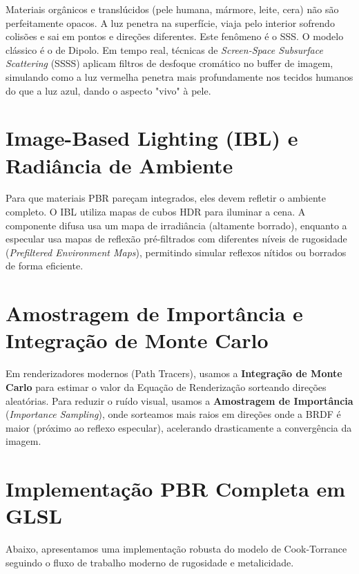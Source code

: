 Materiais orgânicos e translúcidos (pele humana, mármore, leite, cera) não são perfeitamente opacos. A luz penetra na superfície, viaja pelo interior sofrendo colisões e sai em pontos e direções diferentes. Este fenômeno é o SSS. O modelo clássico é o de Dipolo. Em tempo real, técnicas de \textit{Screen-Space Subsurface Scattering} (SSSS) aplicam filtros de desfoque cromático no buffer de imagem, simulando como a luz vermelha penetra mais profundamente nos tecidos humanos do que a luz azul, dando o aspecto "vivo" à pele.

\section{Image-Based Lighting (IBL) e Radiância de Ambiente}

Para que materiais PBR pareçam integrados, eles devem refletir o ambiente completo. O IBL utiliza mapas de cubos HDR para iluminar a cena. A componente difusa usa um mapa de irradiância (altamente borrado), enquanto a especular usa mapas de reflexão pré-filtrados com diferentes níveis de rugosidade (\textit{Prefiltered Environment Maps}), permitindo simular reflexos nítidos ou borrados de forma eficiente.

\section{Amostragem de Importância e Integração de Monte Carlo}

Em renderizadores modernos (Path Tracers), usamos a \textbf{Integração de Monte Carlo} para estimar o valor da Equação de Renderização sorteando direções aleatórias. Para reduzir o ruído visual, usamos a \textbf{Amostragem de Importância} (\textit{Importance Sampling}), onde sorteamos mais raios em direções onde a BRDF é maior (próximo ao reflexo especular), acelerando drasticamente a convergência da imagem.

\section{Implementação PBR Completa em GLSL}

Abaixo, apresentamos uma implementação robusta do modelo de Cook-Torrance seguindo o fluxo de trabalho moderno de rugosidade e metalicidade.

